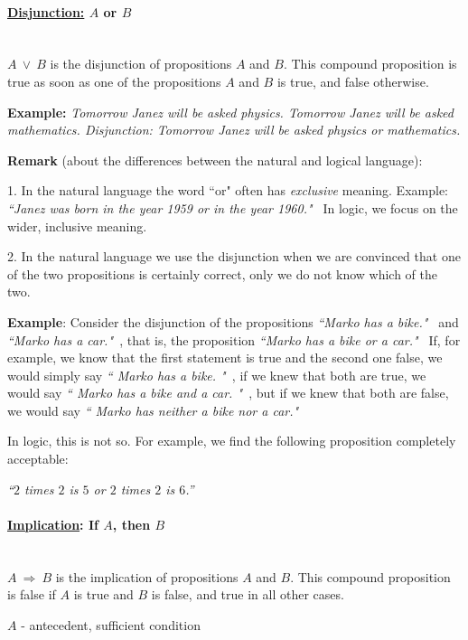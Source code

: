 \documentclass[11pt,paper=b5,footinclude,headinclude]{scrbook} %
\def\ali {{~\vee~}}
\def\sledi {{~\Rightarrow~}}
\theoremstyle{remark}
\theoremstyle{definition} %
\theoremstyle{theorem} %
\begin{document}
\medskip
\paragraph{\underline{Disjunction:} $A$ or $B$} \mbox{}\\

$A\ali B$ is the disjunction of propositions $A$ and $B$.
This compound proposition is true
as soon as one of the propositions $A$ and $B$ is true, and false otherwise.

\textbf{Example:} {\em
Tomorrow Janez will be asked physics.
Tomorrow Janez will be asked mathematics.
Disjunction:
Tomorrow Janez will be asked physics or mathematics.}

\medskip
\textbf{Remark} (about the differences between the natural and logical language):

1. In the natural language the word ``or" often has {\em exclusive} meaning.
Example: {\em ``Janez was born in the year 1959 or in the year 1960."~}
In logic, we focus on the wider, inclusive meaning.

2. In the natural language we use the disjunction when we are convinced that one of the two propositions is certainly correct,
only we do not know which of the two.

\textbf{Example}: Consider the disjunction of the propositions
{\em ``Marko has a bike."~} and {\em ``Marko has a car."~}, that is,
the proposition
{\em ``Marko has a bike or a car."~}
If, for example, we know
that the first statement is true and the second one false, we would simply say
{\em `` Marko has a bike. "~}, if we knew that both are true, we would say
{\em `` Marko has a bike and a car. "~}, but if we knew that both are false, we would say
{\em `` Marko has neither a bike nor a car."~}

In logic, this is not so. For example, we find the following proposition completely acceptable:

{\em ``$2$ times $2$ is $5$ or $2$ times $2$ is $6$.''}

\medskip
\paragraph{\underline{Implication}: If $A$, then $B$}\mbox{}\\


$A\sledi B$ is the implication of propositions $A$ and $B$.
This compound proposition is false if $A$ is true and $B$ is false, and true in all other cases.

$A$ - antecedent, sufficient condition
\end{document}
